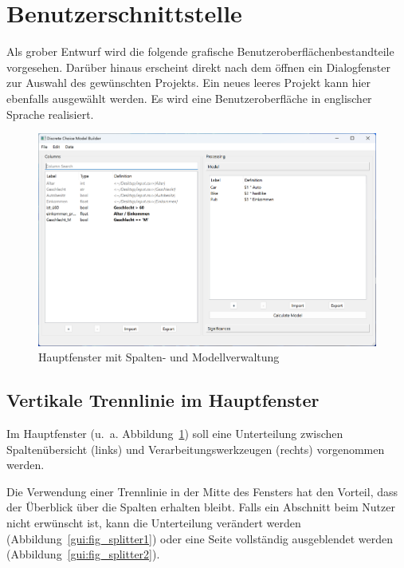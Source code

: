 \documentclass{article}
\begin{document}
\clearpage
\section{Benutzerschnittstelle}
Als grober Entwurf wird die folgende grafische Benutzeroberflächenbestandteile vorgesehen. Darüber hinaus erscheint direkt nach dem öffnen ein Dialogfenster zur Auswahl des gewünschten Projekts. Ein neues leeres Projekt kann hier ebenfalls ausgewählt werden. Es wird eine Benutzeroberfläche in englischer Sprache realisiert.\\

\begin{figure}[H]%
  \centering
  \includegraphics[width=12cm]{specifications/img/gui-screenshots/columns+model.png}
  \caption{Hauptfenster mit Spalten- und Modellverwaltung}
  \label{gui:fig_columns+model}
\end{figure}

\subsection{Vertikale Trennlinie im Hauptfenster}

Im Hauptfenster (u.~a. Abbildung~\ref{gui:fig_columns+model}) soll eine Unterteilung zwischen Spaltenübersicht (links) und Verarbeitungswerkzeugen (rechts) vorgenommen werden. 

Die Verwendung einer Trennlinie in der Mitte des Fensters hat den Vorteil, dass der Überblick über die Spalten erhalten bleibt. Falls ein Abschnitt beim Nutzer nicht erwünscht ist, kann die Unterteilung verändert werden (Abbildung~\ref{gui:fig_splitter1}) oder eine Seite vollständig ausgeblendet werden (Abbildung~\ref{gui:fig_splitter2}).
\end{document}
